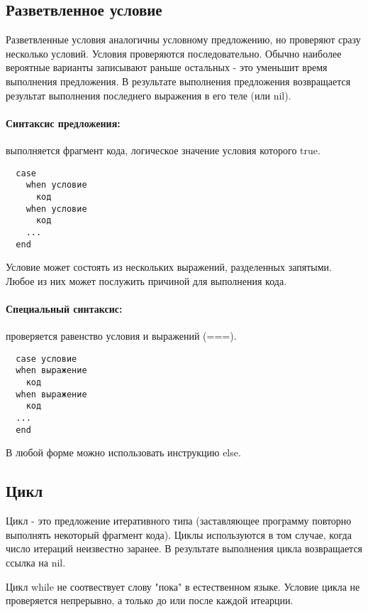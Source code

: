 \subsection{Разветвленное условие}

Разветвленные условия аналогичны условному предложению, но проверяют сразу несколько условий. Условия проверяются последовательно. Обычно наиболее вероятные варианты записывают раньше остальных - это уменьшит время выполнения предложения. В результате выполнения предложения возвращается результат выполнения последнего выражения в его теле (или nil).

\paragraph*{Синтаксис предложения:} выполняется фрагмент кода, логическое значение условия которого true.

\begin{verbatim}
  case
    when условие
      код
    when условие
      код
    ...
  end
\end{verbatim}

Условие может состоять из нескольких выражений, разделенных запятыми. Любое из них может послужить причиной для выполнения кода.

\paragraph*{Специальный синтаксис:} проверяется равенство условия и выражений (===).

\begin{verbatim}
  case условие
  when выражение
    код
  when выражение
    код
  ...
  end
\end{verbatim}

В любой форме можно использовать инструкцию else.

\subsection{Цикл}

Цикл - это предложение итеративного типа (заставляющее программу повторно выполнять некоторый фрагмент кода). Циклы используются в том случае, когда число итераций неизвестно заранее. В результате выполнения цикла возвращается ссылка на nil.

Цикл while не соотвествует слову "пока" в естественном языке. Условие цикла не проверяется непрерывно, а только до или после каждой итеарции.

